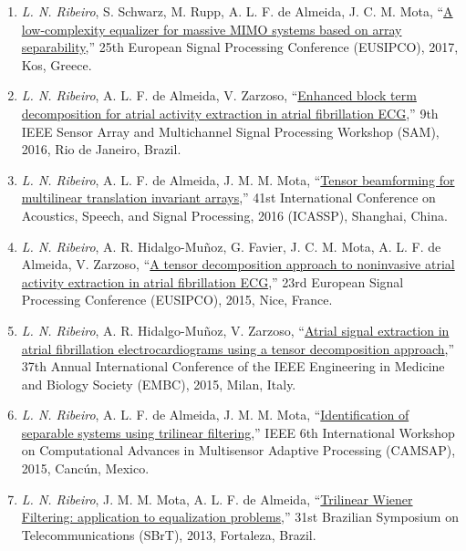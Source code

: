 \begin{enumerate}
	\item \emph{L. N. Ribeiro}, S. Schwarz, M. Rupp, A. L. F. de Almeida, J. C. M. Mota, ``\href{https://doi.org/10.23919/EUSIPCO.2017.8081651}{A low-complexity equalizer for massive MIMO systems based on array separability},'' 25th European Signal Processing Conference (EUSIPCO), 2017, Kos, Greece.
	
	\item \emph{L. N. Ribeiro}, A. L. F. de Almeida, V. Zarzoso, ``\href{https://doi.org/10.1109/SAM.2016.7569709}{Enhanced block term decomposition for atrial activity extraction in atrial fibrillation ECG},'' 9th IEEE Sensor Array and Multichannel Signal Processing Workshop (SAM), 2016, Rio de Janeiro, Brazil.
	
	\item \emph{L. N. Ribeiro},  A. L. F. de Almeida, J. M. M. Mota, ``\href{https://doi.org/10.1109/ICASSP.2016.7472221}{Tensor beamforming for multilinear translation invariant arrays},'' 41st International Conference on Acoustics, Speech, and Signal Processing, 2016 (ICASSP), Shanghai, China.
	
	\item  \emph{L. N. Ribeiro}, A. R. Hidalgo-Mu\~{n}oz, G. Favier, J. C. M. Mota, A. L. F. de Almeida,  V. Zarzoso, ``\href{https://doi.org/10.1109/EUSIPCO.2015.7362850}{A tensor decomposition approach to noninvasive atrial activity extraction in atrial fibrillation ECG},'' 23rd European Signal Processing Conference (EUSIPCO), 2015, Nice, France.
	
	\item \emph{L. N. Ribeiro}, A. R. Hidalgo-Mu\~{n}oz, V. Zarzoso, ``\href{https://doi.org/10.1109/EMBC.2015.7320000}{Atrial signal extraction in atrial fibrillation electrocardiograms using a tensor decomposition approach},'' 37th Annual International Conference of the IEEE Engineering in Medicine and Biology Society (EMBC), 2015, Milan, Italy.
	
	 \item \emph{L. N. Ribeiro},  A. L. F. de Almeida, J. M. M. Mota, ``\href{https://doi.org/10.1109/CAMSAP.2015.7383768}{Identification of separable systems using trilinear filtering},'' IEEE 6th International Workshop on Computational Advances in Multisensor Adaptive Processing (CAMSAP), 2015, Canc\'{u}n, Mexico.
	
	 \item \emph{L. N. Ribeiro}, J. M. M. Mota, A. L. F. de Almeida, ``\href{https://github.com/lnribeiro/lnribeiro.github.io/blob/master/assets/pdf/sbrt13.pdf}{Trilinear Wiener Filtering: application to equalization problems},''  31st Brazilian Symposium on Telecommunications (SBrT), 2013, Fortaleza, Brazil.
\end{enumerate}